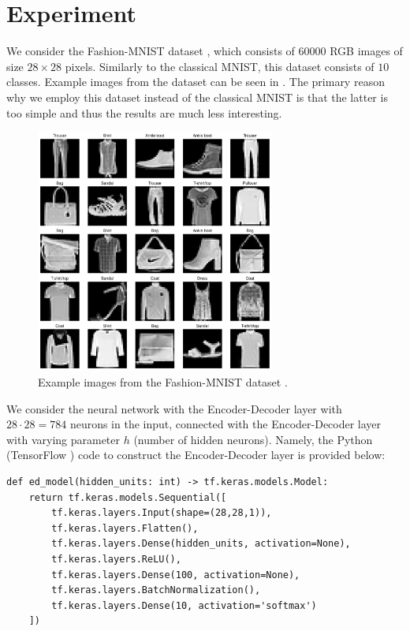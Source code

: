 \documentclass{iacrtrans}
\begin{document}
\section{Experiment}

We consider the Fashion-MNIST dataset \cite{fashion-mnist}, which consists of
$60000$ RGB images of size $28 \times 28$ pixels. Similarly to the classical
MNIST, this dataset consists of $10$ classes. Example images from the dataset
can be seen in . The primary reason why we employ this 
dataset instead of the classical MNIST is that the latter is too simple and 
thus the results are much less interesting.

\begin{figure}
    \centering
    \includegraphics[width=0.7\textwidth]{../code/images/fashion_mnist_grid.pdf}
    \caption{Example images from the Fashion-MNIST dataset \cite{fashion-mnist}.}
    \label{figure:mnist}
\end{figure}

We consider the neural network with the Encoder-Decoder layer with $28 \cdot 28
= 784$ neurons in the input, connected with the Encoder-Decoder layer with
varying parameter $h$ (number of hidden neurons). Namely, the Python (TensorFlow
\cite{tf}) code to construct the Encoder-Decoder layer is provided below:

\begin{verbatim}
def ed_model(hidden_units: int) -> tf.keras.models.Model:
    return tf.keras.models.Sequential([
        tf.keras.layers.Input(shape=(28,28,1)),
        tf.keras.layers.Flatten(),
        tf.keras.layers.Dense(hidden_units, activation=None),
        tf.keras.layers.ReLU(),
        tf.keras.layers.Dense(100, activation=None),
        tf.keras.layers.BatchNormalization(),
        tf.keras.layers.Dense(10, activation='softmax')
    ])
\end{verbatim}
\end{document}
